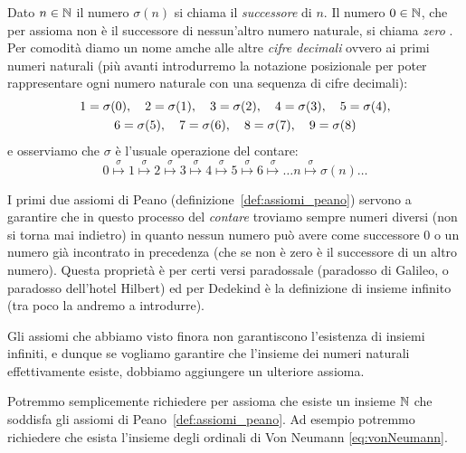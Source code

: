 Dato $n\in {\mathbb N}$ il numero $\sigma(n)$ si chiama il \emph{successore}%
%
 di $n$. 
Il numero $0\in {\mathbb N}$, che per assioma non è il successore di nessun'altro 
numero naturale, si chiama \emph{zero}%
%
. 
Per comodità diamo un nome amche alle altre \emph{cifre decimali}%
%
%
ovvero ai primi numeri naturali
(più avanti introdurremo la notazione posizionale per poter rappresentare ogni numero naturale 
con una sequenza di cifre decimali):
\begin{equation}\label{eq:cifre}
\begin{gathered}
 1 = \sigma(0),\quad  
 2 = \sigma(1),\quad
 3 = \sigma(2),\quad 
 4 = \sigma(3),\quad
 5 = \sigma(4),\\ 
 6 = \sigma(5),\quad 
 7 = \sigma(6),\quad 
 8 = \sigma(7),\quad 
 9 = \sigma(8)
\end{gathered}
\end{equation}
e osserviamo che $\sigma$ è l'usuale operazione del contare:
 \[
 0 \stackrel\sigma\mapsto 1 \stackrel\sigma\mapsto 2 \stackrel\sigma\mapsto 
 3 \stackrel\sigma\mapsto 4 \stackrel\sigma\mapsto 5 \stackrel\sigma\mapsto 
 6 \stackrel\sigma\mapsto \dots  n \stackrel\sigma\mapsto \sigma(n) \dots
 \]

I primi due assiomi di Peano (definizione~\ref{def:assiomi_peano}) 
servono a garantire che in questo processo del \emph{contare}%
%
troviamo sempre numeri diversi (non si torna mai indietro) in quanto nessun numero 
può avere come successore $0$ o un numero già incontrato in precedenza (che 
se non è zero è il successore di un altro numero).
Questa proprietà è per certi versi paradossale
(paradosso di Galileo, o paradosso dell'hotel Hilbert)
%
%
%
%
ed per Dedekind è la definizione di insieme infinito (tra poco la andremo a introdurre).%
%

Gli assiomi che abbiamo visto finora non garantiscono l'esistenza di insiemi infiniti, e dunque se 
vogliamo garantire che l'insieme dei numeri naturali effettivamente esiste, 
dobbiamo aggiungere un ulteriore assioma. 

Potremmo semplicemente richiedere per assioma che esiste un insieme ${\mathbb N}$ che soddisfa gli assiomi
di Peano~\ref{def:assiomi_peano}.
Ad esempio potremmo richiedere 
che esista l'insieme degli ordinali di Von Neumann \eqref{eq:vonNeumann}. 

